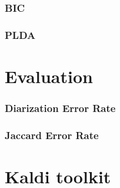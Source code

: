 		\subsubsection{BIC}
		\subsubsection{PLDA}

\section{Evaluation}

	\subsubsection{Diarization Error Rate}
	\subsubsection{Jaccard Error Rate}

\section{Kaldi toolkit}
